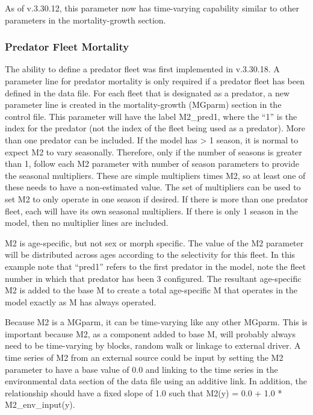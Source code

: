 As of v.3.30.12, this parameter now has time-varying capability similar to other parameters in the mortality-growth section.

\subsubsection{Predator Fleet Mortality}
The ability to define a predator fleet was first implemented in v.3.30.18. A parameter line for predator mortality is only required if a predator fleet has been defined in the data file. For each fleet that is designated as a predator, a new parameter line is created in the mortality-growth (MGparm) section in the control file. This parameter will have the label M2\_pred1, where the ``1'' is the index for the predator (not the index of the fleet being used as a predator). More than one predator can be included. If the model has > 1 season, it is normal to expect M2 to vary seasonally. Therefore, only if the number of seasons is greater than 1, follow each M2 parameter with number of season parameters to provide the seasonal multipliers. These are simple multipliers times M2, so at least one of these needs to have a non-estimated value. The set of multipliers can be used to set M2 to only operate in one season if desired. If there is more than one predator fleet, each will have its own seasonal multipliers. If there is only 1 season in the model, then no multiplier lines are included. 

M2 is age-specific, but not sex or morph specific. The value of the M2 parameter will be distributed across ages according to the selectivity for this fleet. In this example note that ``pred1'' refers to the first predator in the model, note the fleet number in which that predator has been 3 configured. The resultant age-specific M2 is added to the base M to create a total age-specific M that operates in the model exactly as M has always operated. 

Because M2 is a MGparm, it can be time-varying like any other MGparm. This is important because M2, as a component added to base M, will probably always need to be time-varying by blocks, random walk or linkage to external driver. A time series of M2 from an external source could be input by setting the M2 parameter to have a base value of 0.0 and linking to the time series in the environmental data section of the data file using an additive link. In addition, the relationship should have a fixed slope of 1.0 such that M2(y) = 0.0 + 1.0 * M2\_env\_input(y). 


